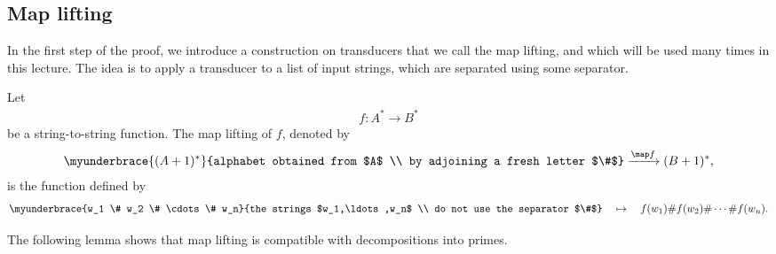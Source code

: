 \subsection{Map lifting}
\label{sec:map-lifting} In the first step of the proof, we introduce a construction on transducers that we call the map lifting, and which will be used many times in this lecture. The idea is to apply a transducer to a list of input strings, which are separated using some separator.

\begin{definition}\label{def:map-lifting}
    Let 
    \begin{align*}
    f : A^* \to B^*
    \end{align*}
    be a string-to-string function. The map lifting of $f$, denoted by 
    \begin{align*}
    \myunderbrace{(A+1)^*}{alphabet obtained from $A$ \\ by adjoining a fresh letter $\#$} \xrightarrow{\map f} (B+1)^*,
\end{align*}
     is the function defined by 
         \begin{align*}
    \myunderbrace{w_1 \# w_2 \# \cdots \# w_n}{the strings $w_1,\ldots,w_n$ \\ do not  use the separator $\#$} 
    \quad \mapsto \quad 
    f(w_1) \# f(w_2) \# \cdots \# f(w_n).
    \end{align*}
\end{definition}
  The following lemma shows that map lifting is compatible with decompositions into primes. 

